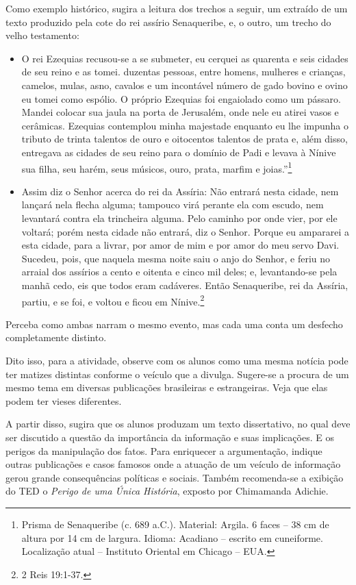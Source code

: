 \documentclass[12pt]{extarticle}
\begin{document}
Como exemplo histórico, sugira a leitura dos trechos a seguir, um
extraído de um texto produzido pela cote do rei assírio Senaqueribe, e,
o outro, um trecho do velho testamento:

\begin{itemize}
\item
O rei Ezequias recusou-se a se submeter, eu cerquei as quarenta e seis
cidades de seu reino e as tomei. duzentas pessoas, entre homens,
mulheres e crianças, camelos, mulas, asno, cavalos e um incontável
número de gado bovino e ovino eu tomei como espólio. O próprio
Ezequias foi engaiolado como um pássaro. Mandei colocar sua jaula na
porta de Jerusalém, onde nele eu atirei vasos e cerâmicas. Ezequias
contemplou minha majestade enquanto eu lhe impunha o tributo de trinta
talentos de ouro e oitocentos talentos de prata e, além disso,
entregava as cidades de seu reino para o domínio de Padi e levava à
Nínive sua filha, seu harém, seus músicos, ouro, prata, marfim e
joias.''\footnote{Prisma de Senaqueribe (c. 689 a.C.). Material: Argila. 6 faces -- 38 cm de altura por 14 cm de largura. Idioma: Acadiano -- escrito em
cuneiforme. Localização atual -- Instituto Oriental em Chicago --
EUA.}

\item
  Assim diz o Senhor acerca do rei da Assíria: Não entrará nesta cidade,
  nem lançará nela flecha alguma; tampouco virá perante ela com escudo,
  nem levantará contra ela trincheira alguma. Pelo caminho por onde
  vier, por ele voltará; porém nesta cidade não entrará, diz o Senhor.
  Porque eu ampararei a esta cidade, para a livrar, por amor de mim e
  por amor do meu servo Davi. Sucedeu, pois, que naquela mesma noite
  saiu o anjo do Senhor, e feriu no arraial dos assírios a cento e
  oitenta e cinco mil deles; e, levantando-se pela manhã cedo, eis que
  todos eram cadáveres. Então Senaqueribe, rei da Assíria, partiu, e se
  foi, e voltou e ficou em Nínive.\footnote{2 Reis 19:1-37.}
\end{itemize}

Perceba como ambas narram o mesmo evento, mas cada uma conta um desfecho
completamente distinto.

Dito isso, para a atividade, observe com os alunos como uma mesma
notícia pode ter matizes distintas conforme o veículo que a divulga.
Sugere-se a procura de um mesmo tema em diversas publicações brasileiras
e estrangeiras. Veja que elas podem ter vieses diferentes.

A partir disso, sugira que os alunos produzam um texto dissertativo, no
qual deve ser discutido a questão da importância da informação e suas
implicações. E os perigos da manipulação dos fatos. Para enriquecer a
argumentação, indique outras publicações e casos famosos onde a atuação
de um veículo de informação gerou grande consequências políticas e
sociais. Também recomenda-se a exibição do TED o \emph{Perigo de uma
Única História}, exposto por Chimamanda Adichie.
\end{document}
